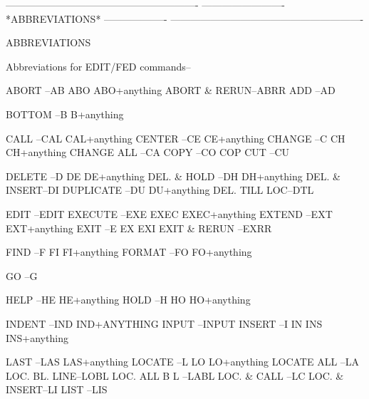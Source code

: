  
 
 
 
 
 
 
 
 
 
 
 
 
 
 
 
 
 
 
 
 
 
 
 
 
----------------------------------------------------------
-------------------------  *ABBREVIATIONS*  -------------------
----------------------------------------------------------
 
ABBREVIATIONS
 
Abbreviations for EDIT/FED commands--
 
   ABORT        --AB           ABO          ABO+anything
   ABORT & RERUN--ABRR
   ADD          --AD
 
   BOTTOM       --B            B+anything
 
   CALL         --CAL          CAL+anything
   CENTER       --CE           CE+anything
   CHANGE       --C            CH           CH+anything
   CHANGE ALL   --CA
   COPY         --CO           COP
   CUT          --CU
 
   DELETE       --D            DE           DE+anything
   DEL. & HOLD  --DH           DH+anything
   DEL. & INSERT--DI
   DUPLICATE    --DU           DU+anything
   DEL. TILL LOC--DTL
 
   EDIT         --EDIT
   EXECUTE      --EXE          EXEC         EXEC+anything
   EXTEND       --EXT          EXT+anything
   EXIT         --E            EX           EXI
   EXIT & RERUN --EXRR
 
   FIND         --F            FI           FI+anything
   FORMAT       --FO           FO+anything
 
   GO           --G
 
   HELP         --HE           HE+anything
   HOLD         --H            HO           HO+anything
 
   INDENT       --IND          IND+ANYTHING
   INPUT        --INPUT
   INSERT       --I            IN           INS          INS+anything
 
   LAST         --LAS          LAS+anything
   LOCATE       --L            LO           LO+anything
   LOCATE ALL   --LA
   LOC. BL. LINE--LOBL
   LOC. ALL B L --LABL
   LOC. & CALL  --LC
   LOC. & INSERT--LI
   LIST         --LIS
 
